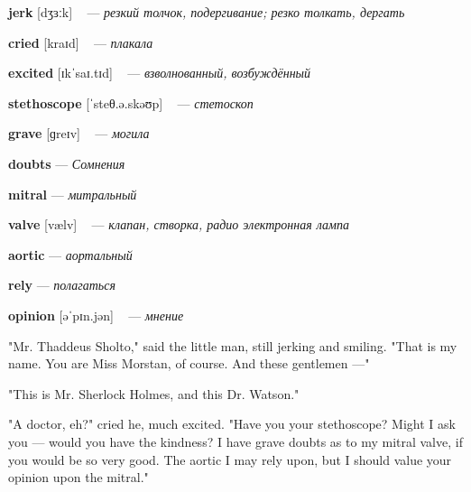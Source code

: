 \documentclass[a4paper,oneside,12pt]{amsart}
\begin{document}
{\large 

 {\bf jerk } [dʒɜːk] ~ --- \emph{ резкий толчок, подергивание; резко толкать, дергать }

{\bf cried } [kraɪd] ~ --- \emph{ плакала }

{\bf excited } [ɪkˈsaɪ.tɪd] ~ --- \emph{ взволнованный, возбуждённый }

{\bf stethoscope } [ˈsteθ.ə.skəʊp] ~ --- \emph{ стетоскоп }

{\bf grave } [ɡreɪv] ~ --- \emph{ могила }

{\bf doubts } --- \emph{ Сомнения }

{\bf mitral } --- \emph{ митральный }

{\bf valve } [vælv] ~ --- \emph{ клапан, створка, радио электронная лампа }

{\bf aortic } --- \emph{ аортальный }

{\bf rely } --- \emph{ полагаться }

{\bf opinion } [əˈpɪn.jən] ~ --- \emph{ мнение }

} \vspace{6mm} {\Large 

 
"Mr. Thaddeus Sholto," said the little man, still jerking and smiling. "That is my name. You are Miss Morstan, of course. And these gentlemen ---"

"This is Mr. Sherlock Holmes, and this Dr. Watson."

"A doctor, eh?" cried he, much excited. "Have you your stethoscope? Might I ask you --- would you have the kindness? I have grave doubts as to my mitral valve, if you would be so very good. The aortic I may rely upon, but I should value your opinion upon the mitral."
\\ } 
\end{document}
